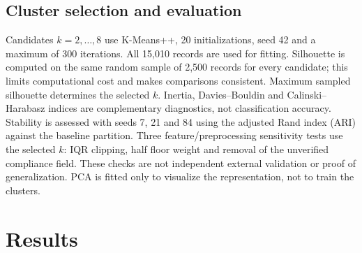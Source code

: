 \documentclass[conference]{IEEEtran}
\begin{document}
\subsection{Cluster selection and evaluation}
Candidates $k=2,\ldots,8$ use K-Means++, 20 initializations, seed 42 and a maximum of 300 iterations. All 15,010 records are used for fitting. Silhouette is computed on the same random sample of 2,500 records for every candidate; this limits computational cost and makes comparisons consistent. Maximum sampled silhouette determines the selected $k$. Inertia, Davies--Bouldin and Calinski--Harabasz indices are complementary diagnostics, not classification accuracy.
Stability is assessed with seeds 7, 21 and 84 using the adjusted Rand index (ARI) against the baseline partition. Three feature/preprocessing sensitivity tests use the selected $k$: IQR clipping, half floor weight and removal of the unverified compliance field. These checks are not independent external validation or proof of generalization. PCA is fitted only to visualize the representation, not to train the clusters.

\section{Results}
\end{document}
